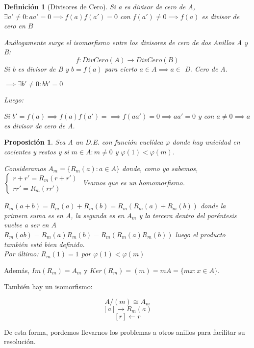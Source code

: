 \documentclass[11pt, a4paper, titlepage]{article}
\makeatletter
\renewenvironment{proof}[1][\proofname] {\vspace{-15pt}\par\pushQED{\qed}\normalfont\topsep6\p@\@plus6\p@\relax\trivlist\item[\hskip\labelsep\it#1\@addpunct{.}]\ignorespaces}{\popQED\endtrivlist\@endpefalse}
\theoremstyle{theorem-style}
\newtheorem*{nprop}{Proposición}
\theoremstyle{definition-style}
\newtheorem*{ndef}{Definición}
\theoremstyle{remark-style}
\theoremstyle{example-style}
\makeatother
\begin{document}
\begin{ndef}[Divisores de Cero]
	Si a es divisor de cero de $A$, $\exists a'\ne 0 : aa' = 0 \implies f(a)f(a') = 0$ con $f(a') \ne 0 \implies f(a)$ es divisor de cero en $B$
	
	Análogamente surge el isomorfismo entre los divisores de cero de dos Anillos A y B:
	$$f: DivCero(A) \to DivCero(B)$$ Si b es divisor de B y $b=f(a)$ para cierto $a \in A\implies  a \in $ D. Cero de A.
	
	$\implies \exists b' \ne 0 : bb' = 0$
	
	Luego:
	
	Si $b' = f(a)\implies f(a)f(a') =  \implies f(aa') = 0 \implies aa' = 0$ y con $a\ne 0 \implies a$ es divisor de cero de A.
\end{ndef}

\begin{nprop}
		Sea A un D.E. con función euclídea $\varphi$ donde hay unicidad en cocientes y restos y si $m\in A: m\ne 0$ y $ \varphi(1) < \varphi(m)$.
	
		Consideramos $A_m = \{R_m(a): a \in A\}$ donde, como ya sabemos, $\begin{cases}
	r+r' = R_m(r+r')\\
	rr' = R_m(rr')
\end{cases}$ Veamos que es un homomorfismo.\\
\begin{proof}
	$R_m(a+b) = R_m(a) + R_m(b) = R_m(R_m(a)+R_m(b))$ donde la primera suma es en A, la segunda es en $A_m$ y la tercera dentro del paréntesis vuelve a ser en $A$\\
	$R_m(ab) = R_m(a)R_m(b) = R_m(R_m(a)R_m(b))$ luego el producto también está bien definido.\\
	Por último: $R_m(1) = 1$ por $\varphi(1) < \varphi(m)$
\end{proof}
\end{nprop}
Además, $Im(R_m) = A_m$ y $Ker(R_m) = (m) = mA = \{mx : x\in A\}$.

También hay un isomorfismo:

\[
A/(m)  \cong A_m
\]\[
[a]\to R_m(a)
\]\[
[r] \leftarrow r
\]

De esta forma, pordemos llevarnos los problemas a otros anillos para facilitar su resolución.
\end{document}
